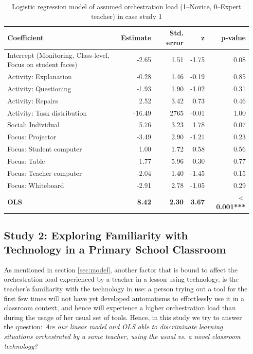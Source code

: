 \documentclass[10pt,journal,compsoc]{IEEEtran}
\begin{document}
\begin{table}[!t]
\caption{Logistic regression model of assumed orchestration load (1--Novice, 0--Expert teacher) in case study 1}
\label{tab:case1results}
\centering
\begin{tabular}{|p{2.8cm}||r|r|r|r|}
\hline
Coefficient & Estimate & Std. error & z & p-value\\
\hline
\hline
Intercept (Monitoring, Class-level, Focus on student faces) & -2.65 & 1.51 & -1.75 & 0.08 \\
Activity: Explanation & -0.28 & 1.46 & -0.19 & 0.85 \\
Activity: Questioning & -1.93 & 1.90 & -1.02 & 0.31 \\
Activity: Repairs & 2.52 & 3.42 & 0.73 & 0.46 \\
Activity: Task distribution & -16.49 & 2765 & -0.01 & 1.00 \\
Social: Individual & 5.76 & 3.23 & 1.78 & 0.07 \\
Focus: Projector & -3.49 & 2.90 & -1.21 & 0.23 \\
Focus: Student computer & 1.00 & 1.72 & 0.58 & 0.56 \\
Focus: Table & 1.77 & 5.96 & 0.30 & 0.77 \\
Focus: Teacher computer & -2.04 & 1.40 & -1.45 & 0.15 \\
Focus: Whiteboard & -2.91 & 2.78 & -1.05 & 0.29 \\
\textbf{OLS} & \textbf{8.42} & \textbf{2.30} & \textbf{3.67} & \textbf{$<$0.001***} \\
\hline
\end{tabular}
\end{table}


\subsection{Study 2: Exploring Familiarity with Technology in a Primary School Classroom}
\label{sec:study2}

As mentioned in section \ref{sec:model}, another factor that is bound to affect the orchestration load experienced by a teacher in a lesson using technology, is the teacher's familiarity with the technology in use: a person trying out a tool for the first few times will not have yet developed automatisms to effortlessly use it in a classroom context, and hence will experience a higher orchestration load than during the usage of her usual set of tools. Hence, in this study we try to answer the question: \textit{Are our linear model and OLS able to discriminate learning situations orchestrated by a same teacher, using the usual vs. a novel classroom technology?}
\end{document}
